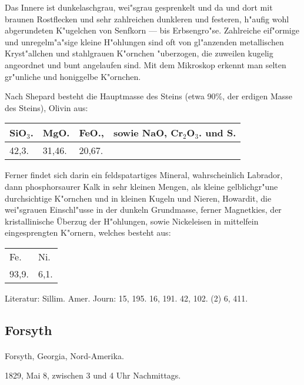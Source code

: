 \documentclass[a4paper, 11pt, oneside]{article}
\begin{document}
Das Innere ist dunkelaschgrau, wei"sgrau gesprenkelt und da und dort mit braunen Rostflecken und sehr zahlreichen dunkleren und festeren, h"aufig wohl abgerundeten K"ugelchen von Senfkorn --- bis Erbsengro"se. Zahlreiche eif"ormige und unregelm"a"sige kleine H"ohlungen sind oft von gl"anzenden metallischen Kryst"allchen und stahlgrauen K"ornchen "uberzogen, die zuweilen kugelig angeordnet und bunt angelaufen sind. Mit dem Mikroskop erkennt man selten gr"unliche und honiggelbe K"ornchen.

Nach Shepard besteht die Hauptmasse des Steins (etwa 90\%, der erdigen Masse des Steins), Olivin aus:
\begin{table}[!ht]
    \centering
    \begin{tabular}{l l l l}
        SiO$_{3}$. & MgO. & FeO., & sowie NaO, Cr$_{2}$O$_{3}$. und S. \\ \hline
        42,3. & 31,46. & 20,67. &  \\
    \end{tabular}
\end{table}

Ferner findet sich darin ein feldspatartiges Mineral, wahrscheinlich Labrador, dann phosphorsaurer Kalk in sehr kleinen Mengen, als kleine gelblichgr"une durchsichtige K"ornchen und in kleinen Kugeln und Nieren, Howardit, die wei"sgrauen Einschl"usse in der dunkeln Grundmasse, ferner Magnetkies, der kristallinische Überzug der H"ohlungen, sowie Nickeleisen in mittelfein eingesprengten K"ornern, welches besteht aus:
\begin{table}[!ht]
    \centering
    \begin{tabular}{l l}
        Fe. & Ni. \\
        93,9. & 6,1. \\
    \end{tabular}
\end{table}

\footnotesize
Literatur: Sillim. Amer. Journ: 15, 195. 16, 191. 42, 102. (2) 6, 411.

\subsection{Forsyth}
\normalsize
\paragraph{}
Forsyth, Georgia, Nord-Amerika.

1829, Mai 8, zwischen 3 und 4 Uhr Nachmittags.
\end{document}
